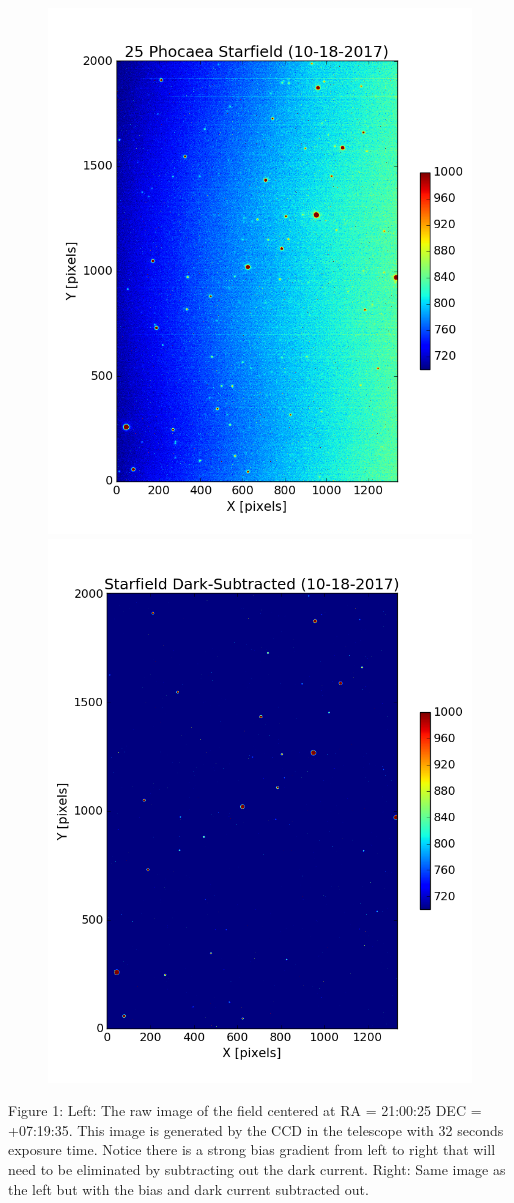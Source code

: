 \documentclass[onecolumn, 12pt, a4paper]{article}
\begin{document}
\begin{subfigure}{\linewidth}\hspace*{-1.cm}
  \includegraphics[width=.5\linewidth]{figure_1.png}
  \includegraphics[width=.485\linewidth]{figure_1-1.png}
  \end{subfigure}\par\medskip


\newline
Figure 1: Left: The raw image of the field centered at RA = 21:00:25 DEC = +07:19:35. This image is generated by the CCD in the telescope with 32 seconds exposure time. Notice there is a strong bias gradient from left to right that will need to be eliminated by subtracting out the dark current. Right: Same image as the left but with the bias and dark current subtracted out.
\end{document}
